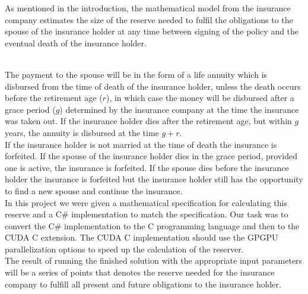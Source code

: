 As mentioned in the introduction, the mathematical model from the insurance company estimates the size of the reserve needed to fulfil the obligations to the spouse of the insurance holder at any time between signing of the policy and the eventual death of the insurance holder. 

\\The payment to the spouse will be in the form of a life annuity which is disbursed from the time of death of the insurance holder, unless the death occurs before the retirement age ($r$), in which case the money will be disbursed after a grace period ($g$) determined by the insurance company at the time the insurance was taken out. If the insurance holder dies after the retirement age, but within $g$ years, the annuity is disbursed at the time $g + r$. \\

If the insurance holder is not married at the time of death the insurance is forfeited. If the spouse of the insurance holder dies in the grace period, provided one is active, the insurance is forfeited. If the spouse dies before the insurance holder the insurance is forfeited but the insurance holder still has the opportunity to find a new spouse and continue the insurance. \\

In this project we were given a mathematical specification for calculating this reserve \cite{edlu} and a C\# implementation to match the specification. Our task was to convert the C\# implementation to the C programming language and then to the CUDA C extension. The CUDA C implementation should use the GPGPU parallelization options to speed up the calculation of the reserver. \\

The result of running the finished solution with the appropriate input parameters will be a series of points that denotes the reserve needed for the insurance company to fulfill all present and future obligations to the insurance holder.